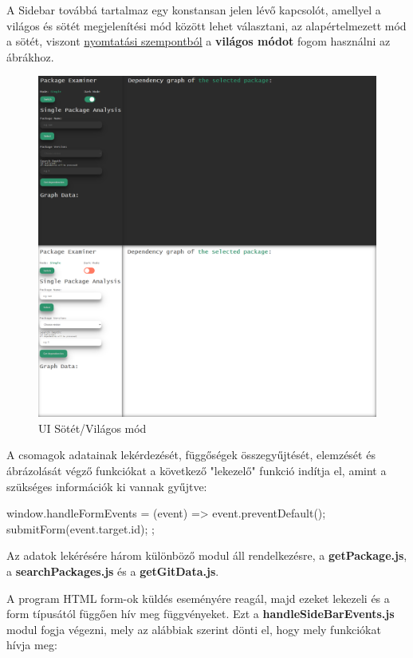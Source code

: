 A Sidebar továbbá tartalmaz egy konstansan jelen lévő kapcsolót, amellyel a világos és sötét megjelenítési mód között lehet választani, az alapértelmezett mód a sötét, viszont \underline{nyomtatási szempontból} a \textbf{világos módot} fogom használni az ábrákhoz. 

\begin{figure}[!h]
	\centering
	\includegraphics[scale=0.15]{images/ui_darkmode.png}
	\caption{UI Sötét/Világos mód}
	\label{fig:ui_darkmode}
\end{figure}

A csomagok adatainak lekérdezését, függőségek összegyűjtését, elemzését és ábrázolását végző funkciókat a következő "lekezelő" funkció indítja el, amint a szükséges információk ki vannak gyűjtve:

\begin{js}
window.handleFormEvents = (event) => {
	event.preventDefault();
	submitForm(event.target.id);
};
\end{js}

\pagebreak


Az adatok lekérésére három különböző modul áll rendelkezésre, a \textbf{getPackage.js}, a \textbf{searchPackages.js} és a \textbf{getGitData.js}.

A program HTML form-ok küldés eseményére reagál, majd ezeket lekezeli és a form típusától függően hív meg függvényeket. Ezt a \textbf{handleSideBarEvents.js} modul fogja végezni, mely az alábbiak szerint dönti el, hogy mely funkciókat hívja meg:

